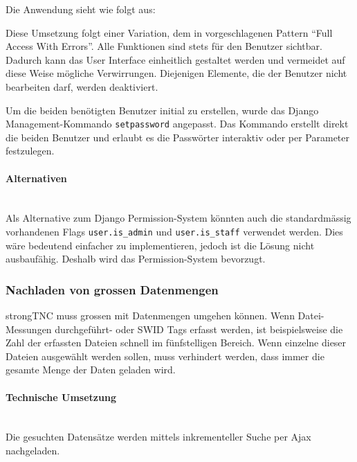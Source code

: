 Die Anwendung sieht wie folgt aus:


Diese Umsetzung folgt einer Variation, dem in \cite{posa1} vorgeschlagenen Pattern \enquote{Full Access With Errors}. Alle Funktionen sind stets für den Benutzer sichtbar. Dadurch kann das User Interface einheitlich gestaltet werden und vermeidet auf diese Weise mögliche Verwirrungen. Diejenigen Elemente, die der Benutzer nicht bearbeiten darf, werden deaktiviert. 

Um die beiden benötigten Benutzer initial zu erstellen, wurde das Django
Management-Kommando \texttt{setpassword} angepasst. Das Kommando erstellt direkt
die beiden Benutzer und erlaubt es die Passwörter interaktiv oder per Parameter
festzulegen.

\paragraph{Alternativen} \hspace{0px} \\
Als Alternative zum Django Permission-System könnten auch die standardmässig
vorhandenen Flags \texttt{user.is\_admin} und \texttt{user.is\_staff} verwendet
werden. Dies wäre bedeutend einfacher zu implementieren, jedoch ist die Lösung
nicht ausbaufähig. Deshalb wird das Permission-System bevorzugt.

\subsubsection{Nachladen von grossen Datenmengen}
strongTNC muss grossen mit Datenmengen umgehen können. Wenn Datei-Messungen
durchgeführt- oder SWID Tags erfasst werden, ist beispielsweise die Zahl der
erfassten Dateien schnell im fünfstelligen Bereich. Wenn einzelne dieser Dateien
ausgewählt werden sollen, muss verhindert werden, dass immer die gesamte Menge
der Daten geladen wird.

\paragraph{Technische Umsetzung} \hspace{0pt} \\
Die gesuchten Datensätze werden mittels inkrementeller Suche per Ajax
nachgeladen.

